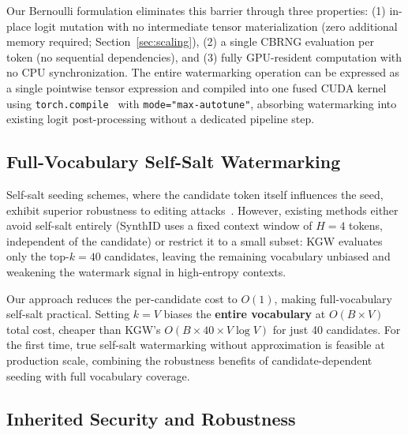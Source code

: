 \documentclass[11pt]{article}
\begin{document}
Our Bernoulli formulation eliminates this barrier through three properties: (1) in-place logit mutation with no intermediate tensor materialization (zero additional memory required; Section~\ref{sec:scaling}), (2) a single CBRNG evaluation per token (no sequential dependencies), and (3) fully GPU-resident computation with no CPU synchronization. The entire watermarking operation can be expressed as a single pointwise tensor expression and compiled into one fused CUDA kernel using \texttt{torch.compile}~\cite{ansel2024pytorch2,tillet2019triton} with \texttt{mode="max-autotune"}, absorbing watermarking into existing logit post-processing without a dedicated pipeline step.

\subsection{Full-Vocabulary Self-Salt Watermarking}
\label{sec:selfsalt}

Self-salt seeding schemes, where the candidate token itself influences the seed, exhibit superior robustness to editing attacks~\cite{kirchenbauer2023watermark}. However, existing methods either avoid self-salt entirely (SynthID uses a fixed context window of $H=4$ tokens, independent of the candidate) or restrict it to a small subset: KGW evaluates only the top-$k=40$ candidates, leaving the remaining vocabulary unbiased and weakening the watermark signal in high-entropy contexts.

Our approach reduces the per-candidate cost to $O(1)$, making full-vocabulary self-salt practical. Setting $k = V$ biases the \textbf{entire vocabulary} at $O(B \times V)$ total cost, cheaper than KGW's $O(B \times 40 \times V \log V)$ for just 40 candidates. For the first time, true self-salt watermarking without approximation is feasible at production scale, combining the robustness benefits of candidate-dependent seeding with full vocabulary coverage.

\subsection{Inherited Security and Robustness}
\label{sec:security}
\end{document}
